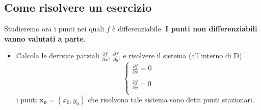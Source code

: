 \documentclass[a4paper,12pt]{book}
\begin{document}
\subsection{Come risolvere un esercizio}
Studieremo ora i punti nei quali $f$ è differenziabile. \textbf{I punti non differenziabili vanno valutati a parte}.
\begin{itemize}
\item Calcola le derivate parziali $\frac{\partial f}{\partial x}$, $\frac{\partial f}{\partial y}$, e risolvere il sistema (all'interno di D)
\begin{displaymath}
\left\{ \begin{array}{ll}
\frac{\partial f}{\partial x}=0\\
\\
\frac{\partial f}{\partial y}=0\\
\end{array} \right.
\end{displaymath}
i punti $\boldsymbol{x_0}=(x_0,y_0)$ che risolvono tale sistema sono detti punti stazionari.


\end{itemize}
\end{document}
